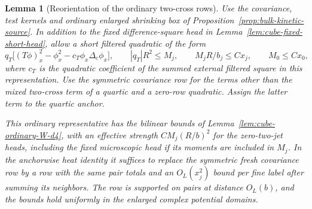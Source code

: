 \documentclass[11pt]{article}
\newtheorem{lemma}[theorem]{Lemma}
\theoremstyle{definition}
\begin{document}
\begin{lemma}[Reorientation of the ordinary two-cross rows]
\label{lem:kinetic-reorient}
Use the covariance, test kernels and ordinary enlarged shrinking box
of Proposition~\ref{prop:bulk-kinetic-source}. In addition to the
fixed difference-square head in Lemma~\ref{lem:cube-fixed-short-head},
allow a short filtered quadratic of the form
\begin{equation}
 q_T\bigl[(T\phi)_x^2-\phi_x^2-c_T\phi_x\Delta_{\mathrm c}\phi_x\bigr],
 \qquad |q_T|R^2\le M_j,\qquad
 M_jR/b_j\le Cx_j,\qquad M_0\le Cx_0 ,
\end{equation}
where \(c_T\) is the quadratic coefficient of the summed
external filtered square in this representation. Use the symmetric
covariance row for the terms other than the mixed two-cross term
of a quartic and a zero-row quadratic. Assign the latter term to
the quartic anchor.

This ordinary representative has the bilinear bounds of
Lemma~\ref{lem:cube-ordinary-W-d4}, with an effective strength
\(C M_j(R/b)^2\) for the zero-two-jet heads, including
the fixed microscopic head if its moments are included in
\(M_j\). In the
anchorwise heat identity it suffices to replace the symmetric
fresh covariance row by a row with the same pair totals and an
\(O_L(x_j^2)\) bound per fine label after summing its neighbors.
The row is supported on pairs at distance \(O_L(b)\), and the
bounds hold uniformly in the enlarged complex potential domains.
\end{lemma}
\end{document}
